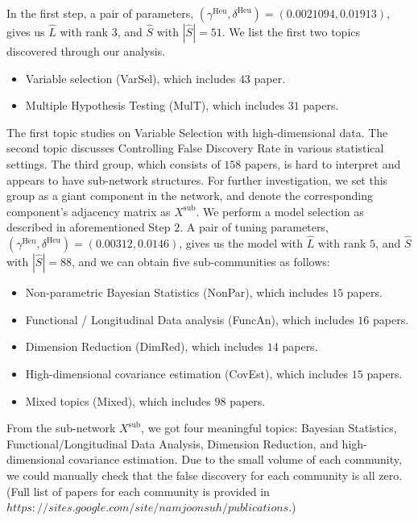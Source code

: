 \documentclass[AMS,STIX1COL]{WileyNJD-v2}
\begin{document}
{In the first step, a pair of parameters, $(\gamma^{\text{Heu}},\delta^{\text{Heu}}) = (0.0021094, 0.01913)$, gives us $\widehat{L}$ with rank $3$, and $\widehat{S}$ with $|\widehat{S}|=51$.
We list the first two topics discovered through our analysis.
\begin{itemize}
    \item Variable selection (VarSel), which includes $43$ paper.
    \item Multiple Hypothesis Testing (MulT), which includes $31$ papers.
\end{itemize}
The first topic studies on Variable Selection with high-dimensional data.
The second topic discusses Controlling False Discovery Rate in various statistical settings.
The third group, which consists of $158$ papers, is hard to interpret and appears to have sub-network structures.
For further investigation, we set this group as a giant component in the network, and denote the corresponding component's adjacency matrix as $X^{\mbox{sub}}$.
We perform a model selection as described in aforementioned Step $2$.
A pair of tuning parameters, $(\gamma^{\text{Heu}},\delta^{\text{Heu}}) = (0.00312, 0.0146)$, gives us the model with $\widehat{L}$ with rank $5$, and $\widehat{S}$ with $|\widehat{S}|=88$,
and we can obtain five sub-communities as follows:
\begin{itemize}
    \item Non-parametric Bayesian Statistics (NonPar), which includes $15$ papers.
    \item Functional / Longitudinal Data analysis (FuncAn), which includes $16$ papers.
    \item Dimension Reduction (DimRed), which includes $14$ papers.
    \item High-dimensional covariance estimation (CovEst), which includes $15$ papers.
    \item Mixed topics (Mixed), which includes $98$ papers.
\end{itemize}
From the sub-network $X^{\mbox{sub}}$, we got four meaningful topics: Bayesian Statistics, Functional/Longitudinal Data Analysis, Dimension Reduction, and high-dimensional covariance estimation.
Due to the small volume of each community, we could manually check that the false discovery for each community is all zero.
(Full list of papers for each community is provided in $https://sites.google.com/site/namjoonsuh/publications$.)

}
\end{document}
